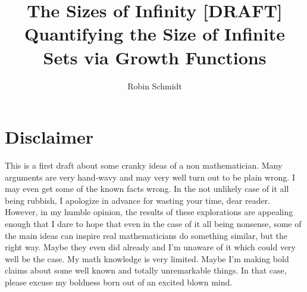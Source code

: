 \documentclass[12pt]{article}
\begin{document}
\parindent=0in
\parskip=0pt

 \setcounter{page}{1}

\title{The Sizes of Infinity [DRAFT]\\ {\Large Quantifying the Size of Infinite Sets via Growth Functions}}
\author{Robin Schmidt}
\maketitle

\section{Disclaimer}
This is a first draft about some cranky ideas of a non mathematician. Many arguments are very hand-wavy and may very well turn out to be plain wrong. I may even get some of the known facts wrong. In the not unlikely case of it all being rubbish, I apologize in advance for wasting your time, dear reader. However, in my humble opinion, the results of these explorations are appealing enough that I dare to hope that even in the case of it all being nonsense, some of the main ideas can inspire real mathematicians do something similar, but the right way. Maybe they even did already and I'm unaware of it which could very well be the case. My math knowledge is very limited. Maybe I'm making bold claims about some well known and totally unremarkable things. In that case, please excuse my boldness born out of an excited blown mind.
\end{document}
